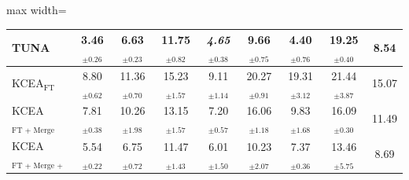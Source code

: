 \begin{table}[!t]
\begin{subtable}{\textwidth}
\begin{adjustbox}{max width=\textwidth}
\begin{tabular}{l c c c c c c c c}
TUNA & \textbf{3.46}$_{\pm 0.26}$ & 6.63$_{\pm 0.23}$ & 11.75$_{\pm 0.82}$ & \textit{4.65}$_{\pm 0.38}$ & 9.66$_{\pm 0.75}$ & 4.40$_{\pm 0.76}$ & 19.25$_{\pm 0.40}$ & 8.54 \\
\midrule
KCEA$_{\text{FT}}$ & 8.80$_{\pm 0.62}$ & 11.36$_{\pm 0.70}$ & 15.23$_{\pm 1.57}$ & 9.11$_{\pm 1.14}$ & 20.27$_{\pm 0.91}$ & 19.31$_{\pm 3.12}$ & 21.44$_{\pm 3.87}$ & 15.07 \\
KCEA$_{\text{FT + Merge}}$ & 7.81$_{\pm 0.38}$ & 10.26$_{\pm 1.98}$ & 13.15$_{\pm 1.57}$ & 7.20$_{\pm 0.57}$ & 16.06$_{\pm 1.18}$ & 9.83$_{\pm 1.68}$ & 16.09$_{\pm 0.30}$ & 11.49 \\
KCEA$_{\text{FT + Merge + Align}}$ & 5.54$_{\pm 0.22}$ & 6.75$_{\pm 0.72}$ & 11.47$_{\pm 1.43}$ & 6.01$_{\pm 1.50}$ & 10.23$_{\pm 2.07}$ & 7.37$_{\pm 0.36}$ & 13.46$_{\pm 5.75}$ & 8.69 \\
\bottomrule
\end{tabular}
\end{adjustbox}
\end{subtable}
\end{table}